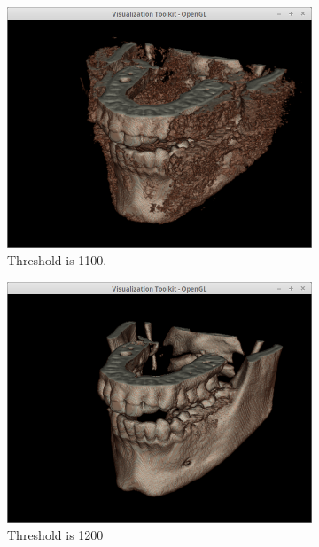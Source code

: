 \documentclass[10pt, b5paper]{article}
\begin{document}
\begin{figure}
    \centering
    \begin{subfigure}[b]{0.33\textwidth}
        \centering
        \includegraphics[width=\textwidth]{T1100}
        \caption{Threshold is 1100.}
    \end{subfigure}
    \hfill
    \begin{subfigure}[b]{0.33\textwidth}
        \centering
        \includegraphics[width=\textwidth]{T1200}
        \caption{Threshold is 1200}
    \end{subfigure}
      \hfill
    \begin{subfigure}[b]{0.33\textwidth}

\end{subfigure}
\end{figure}
\end{document}
